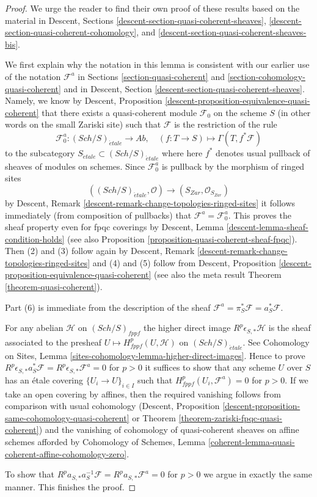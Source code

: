 \documentclass[10pt,a4paper]{amsart}
\theoremstyle{plain}
\theoremstyle{definition}
\theoremstyle{remark}
\numberwithin{equation}{subsection}
\def\Sch{\mathit{Sch}}
\def\etale{{\acute{e}tale}}
\begin{document}
\begin{proof}
We urge the reader to find their own proof of these results
based on the material in
Descent, Sections \ref{descent-section-quasi-coherent-sheaves},
\ref{descent-section-quasi-coherent-cohomology}, and
\ref{descent-section-quasi-coherent-sheaves-bis}.

\medskip\noindent
We first explain why the notation in this lemma is consistent with our
earlier use of the notation $\mathcal{F}^a$ in
Sections \ref{section-quasi-coherent} and
\ref{section-cohomology-quasi-coherent}
and in
Descent, Section \ref{descent-section-quasi-coherent-sheaves}.
Namely, we know by
Descent, Proposition \ref{descent-proposition-equivalence-quasi-coherent}
that there exists a quasi-coherent module
$\mathcal{F}_0$ on the scheme $S$ (in other words on the small
Zariski site) such that $\mathcal{F}$ is the restriction of the
rule
$$
\mathcal{F}_0^a : (\Sch/S)_\etale \longrightarrow \textit{Ab},\quad
(f : T \to S) \longmapsto \Gamma(T, f^*\mathcal{F})
$$
to the subcategory $S_\etale \subset (\Sch/S)_\etale$
where here $f^*$ denotes usual pullback of sheaves of modules on schemes.
Since $\mathcal{F}_0^a$ is pullback by the morphism of ringed
sites
$$
((\Sch/S)_\etale, \mathcal{O}) \longrightarrow (S_{Zar}, \mathcal{O}_{S_{Zar}})
$$
by Descent, Remark \ref{descent-remark-change-topologies-ringed-sites}
it follows immediately (from composition of pullbacks) that
$\mathcal{F}^a = \mathcal{F}_0^a$. This proves the sheaf property
even for fpqc coverings by
Descent, Lemma \ref{descent-lemma-sheaf-condition-holds} (see also
Proposition \ref{proposition-quasi-coherent-sheaf-fpqc}).
Then (2) and (3) follow
again by Descent, Remark \ref{descent-remark-change-topologies-ringed-sites}
and (4) and (5) follow from
Descent, Proposition \ref{descent-proposition-equivalence-quasi-coherent}
(see also the meta result
Theorem \ref{theorem-quasi-coherent}).

\medskip\noindent
Part (6) is immediate from the description of the sheaf
$\mathcal{F}^a = \pi_S^*\mathcal{F} = a_S^*\mathcal{F}$.

\medskip\noindent
For any abelian $\mathcal{H}$ on $(\Sch/S)_{fppf}$ the
higher direct image $R^p\epsilon_{S, *}\mathcal{H}$ is the sheaf
associated to the presheaf $U \mapsto H^p_{fppf}(U, \mathcal{H})$
on $(\Sch/S)_\etale$. See
Cohomology on Sites, Lemma \ref{sites-cohomology-lemma-higher-direct-images}.
Hence to prove
$R^p\epsilon_{S, *}a_S^*\mathcal{F} = R^p\epsilon_{S, *}\mathcal{F}^a = 0$
for $p > 0$ it suffices to show that any scheme $U$ over $S$
has an \'etale covering $\{U_i \to U\}_{i \in I}$ such that
$H^p_{fppf}(U_i, \mathcal{F}^a) = 0$ for $p > 0$.
If we take an open covering by affines, then the required
vanishing follows from comparison with usual cohomology
(Descent, Proposition \ref{descent-proposition-same-cohomology-quasi-coherent}
or
Theorem \ref{theorem-zariski-fpqc-quasi-coherent})
and the vanishing of cohomology of quasi-coherent sheaves
on affine schemes afforded by Cohomology of Schemes, Lemma
\ref{coherent-lemma-quasi-coherent-affine-cohomology-zero}.

\medskip\noindent
To show that $R^pa_{S, *}a_S^{-1}\mathcal{F} = R^pa_{S, *}\mathcal{F}^a = 0$
for $p > 0$ we argue in exactly the same manner. This finishes the proof.
\end{proof}
\end{document}
